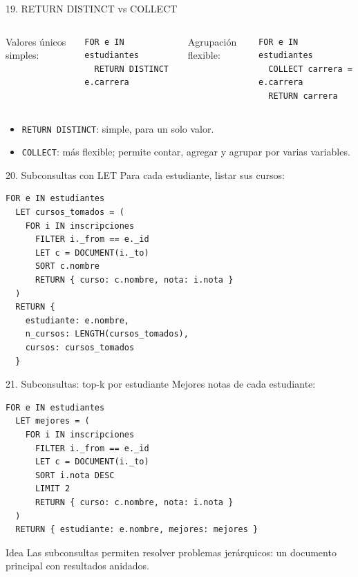 \documentclass[aspectratio=169,11pt]{beamer}
\begin{document}
\begin{frame}[fragile]{19. RETURN DISTINCT vs COLLECT}
\begin{columns}
Valores únicos simples:
\begin{lstlisting}
FOR e IN estudiantes
  RETURN DISTINCT e.carrera
\end{lstlisting}

Agrupación flexible:
\begin{lstlisting}
FOR e IN estudiantes
  COLLECT carrera = e.carrera
  RETURN carrera
\end{lstlisting}
\end{columns}

\vspace{0.3cm}
\begin{itemize}
  \item \texttt{RETURN DISTINCT}: simple, para un solo valor.
  \item \texttt{COLLECT}: más flexible; permite contar, agregar y agrupar por varias variables.
\end{itemize}
\end{frame}

\begin{frame}[fragile]{20. Subconsultas con LET}
Para cada estudiante, listar sus cursos:

\begin{lstlisting}
FOR e IN estudiantes
  LET cursos_tomados = (
    FOR i IN inscripciones
      FILTER i._from == e._id
      LET c = DOCUMENT(i._to)
      SORT c.nombre
      RETURN { curso: c.nombre, nota: i.nota }
  )
  RETURN {
    estudiante: e.nombre,
    n_cursos: LENGTH(cursos_tomados),
    cursos: cursos_tomados
  }
\end{lstlisting}
\end{frame}

\begin{frame}[fragile]{21. Subconsultas: top-k por estudiante}
Mejores notas de cada estudiante:

\begin{lstlisting}
FOR e IN estudiantes
  LET mejores = (
    FOR i IN inscripciones
      FILTER i._from == e._id
      LET c = DOCUMENT(i._to)
      SORT i.nota DESC
      LIMIT 2
      RETURN { curso: c.nombre, nota: i.nota }
  )
  RETURN { estudiante: e.nombre, mejores: mejores }
\end{lstlisting}

\begin{block}{Idea}
Las subconsultas permiten resolver problemas jerárquicos: un documento principal con resultados anidados.
\end{block}
\end{frame}
\end{document}
